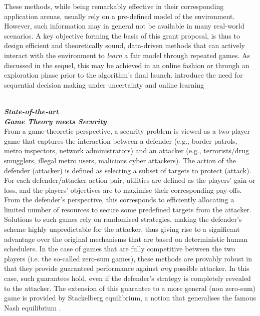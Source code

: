 These methods, while being remarkably effective in their corresponding application arenas, usually rely on a pre-defined model of the environment. However, such information may in general not be available in many real-world scenarios. A key objective forming the basis of this grant proposal, is thus to design efficient and theoretically sound, data-driven methods that can actively interact with the environment to {\em learn} a fair model through repeated games. As discussed in the sequel, this may be achieved in an online fashion or through an exploration phase prior to the algorithm's final launch.  
introduce the need for sequential decision making under uncertainty and online learning




\noindent \textbf{\textit{\\State-of-the-art}}
\noindent \textbf{\textit{\\Game Theory meets Security}}\\
From a game-theoretic perspective, a security problem is viewed as a two-player game that captures the interaction between a defender (e.g., border patrols, metro inspectors, network administrators) and an attacker (e.g., terrorists/drug smugglers, illegal metro users, malicious cyber attackers). The action of the defender (attacker) is defined as selecting a subset of targets to protect (attack). For each defender/attacker action pair, utilities are defined as the players' gain or loss, and the players' objectives are to maximise their corresponding pay-offs. From the defender's perspective, this corresponds to efficiently allocating a limited number of resources to secure some predefined targets from the attacker. 
Solutions to such games rely on randomised strategies, making the defender's scheme highly unpredictable for the attacker, thus giving rise to a significant advantage over the original mechanisms that are based on deterministic human schedulers. In the case of games that are fully competitive between the two players  (i.e. the so-called zero-sum games), these methods are provably robust in that they provide guaranteed performance against {\em any} possible attacker. In this case, such guarantees hold, even if the defender's strategy is completely revealed to the attacker.  
The extension of this guarantee to a more general (non zero-sum) game is provided by Stackelberg equilibrium, a notion that generalises the famous Nash equilibrium \cite{korzhyk2011stackelberg}. 

